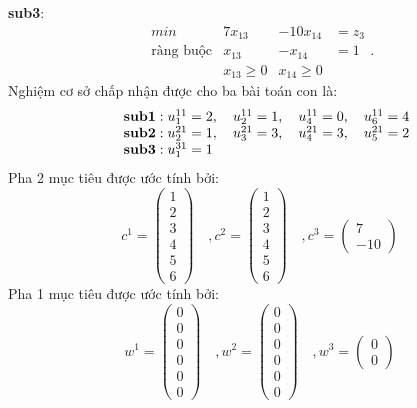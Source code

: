 {\bf sub3}:
\begin{equation}\label{PT1015}
\begin{array}{llllllll}
min&7x_{13}&-10x_{14}&=z_3\\
\textrm{ràng buộc}&x_{13}&-x_{14}&=1\\
&x_{13}\geq0&x_{14}\geq0
\end{array}.
\end{equation}
Nghiệm cơ sở chấp nhận được cho ba bài toán con là:\\
\begin{displaymath}
\begin{array}{llll}
&{\bf sub1}: u_1^{11}=2,\quad u_2^{11}=1,\quad u_4^{11}=0,\quad u_6^{11}=4\\
&{\bf sub2}: u_2^{21}=1,\quad u_3^{21}=3,\quad u_4^{21}=3,\quad u_5^{21}=2\\
&{\bf sub3}: u_1^{31}=1
\end{array}
\end{displaymath}
Pha 2 mục tiêu được ước tính bởi:
$$ c^1 = \left(\begin{matrix} 1\\2\\3\\4\\5\\6\end{matrix} \right) \quad ,c^2 = \left( \begin{matrix} 1\\2\\3\\4\\5\\6\end{matrix} \right)\quad ,c^3=\left(\begin{matrix}7\\-10\end{matrix} \right) $$
Pha 1 mục tiêu được ước tính bởi:
$$ w^1 = \left(\begin{matrix} 0\\0\\0\\0\\0\\0\end{matrix} \right) \quad ,w^2 = \left( \begin{matrix} 0\\0\\0\\0\\0\\0\end{matrix} \right)\quad ,w^3=\left(\begin{matrix}0\\0\end{matrix} \right) $$
